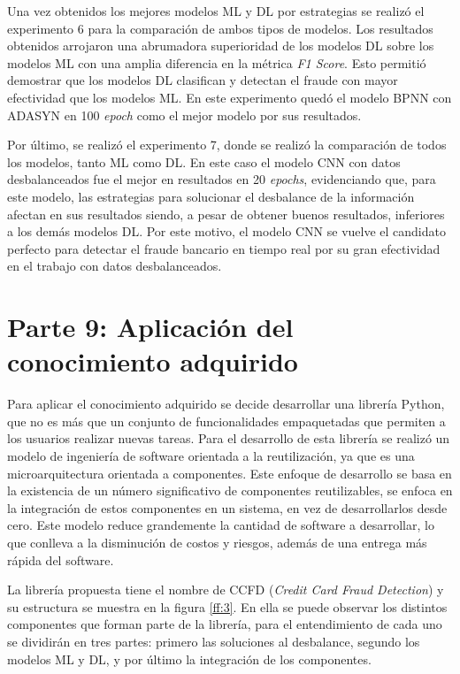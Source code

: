   Una vez obtenidos los mejores modelos ML y DL por estrategias se realiz\'{o} el experimento 6 para la comparaci\'{o}n de ambos tipos de modelos. Los resultados obtenidos arrojaron una abrumadora superioridad de los modelos DL sobre los modelos ML con una amplia diferencia en la m\'{e}trica \textit{F1 Score}. Esto permiti\'{o} demostrar que los modelos DL clasifican y detectan el fraude con mayor efectividad que los modelos ML. En este experimento qued\'{o} el modelo BPNN con ADASYN en 100 \textit{epoch} como el mejor modelo por sus resultados.
  
  Por \'{u}ltimo, se realiz\'{o} el experimento 7, donde se realiz\'{o} la comparaci\'{o}n de todos los modelos, tanto ML como DL. En este caso el modelo CNN con datos desbalanceados fue el mejor en resultados en 20 \textit{epochs}, evidenciando que, para este modelo, las estrategias para solucionar el desbalance de la informaci\'{o}n afectan en sus resultados siendo, a pesar de obtener buenos resultados, inferiores a los dem\'{a}s modelos DL. Por este motivo, el modelo CNN se vuelve el candidato perfecto para detectar el fraude bancario en tiempo real por su gran efectividad en el trabajo con datos desbalanceados.

\section{Parte 9: Aplicaci\'{o}n del conocimiento adquirido}

  Para aplicar el conocimiento adquirido se decide desarrollar una librer\'{i}a Python, que no es m\'{a}s que un conjunto de funcionalidades empaquetadas que permiten a los usuarios realizar nuevas tareas. Para el desarrollo de esta librer\'{i}a se realiz\'{o} un modelo de ingenier\'{i}a de software orientada a la reutilizaci\'{o}n, ya que es una microarquitectura orientada a componentes. Este enfoque de desarrollo se basa en la existencia de un n\'{u}mero significativo de componentes reutilizables, se enfoca en la integraci\'{o}n de estos componentes en un sistema, en vez de desarrollarlos desde cero. Este modelo reduce grandemente la cantidad de software a desarrollar, lo que conlleva a la disminuci\'{o}n de costos y riesgos, adem\'{a}s de una entrega m\'{a}s r\'{a}pida del software.
  
  La librer\'{i}a propuesta tiene el nombre de CCFD (\textit{Credit Card Fraud Detection}) y su estructura se muestra en la figura \ref{ff:3}. En ella se puede observar los distintos componentes que forman parte de la librer\'{i}a, para el entendimiento de cada uno se dividir\'{a}n en tres partes: primero las soluciones al desbalance, segundo los modelos ML y DL, y por \'{u}ltimo la integraci\'{o}n de los componentes.


